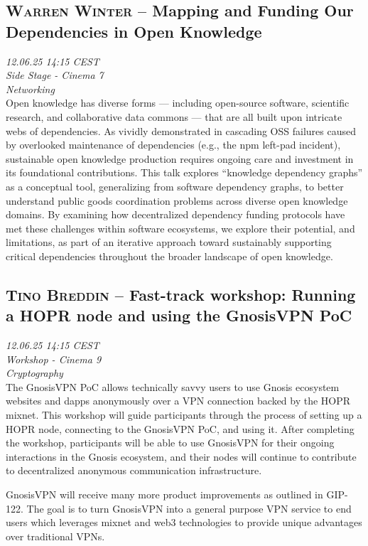 \subsection {\textsc{Warren Winter}  -- Mapping and Funding Our Dependencies in Open Knowledge} \noindent \textit {12.06.25 14:15 CEST\\ Side Stage - Cinema 7\\ Networking}\\[1em] Open knowledge has diverse forms — including open-source software, scientific research, and collaborative data commons — that are all built upon intricate webs of dependencies.  As vividly demonstrated in cascading OSS failures caused by overlooked maintenance of dependencies (e.g., the npm left-pad incident), sustainable open knowledge production requires ongoing care and investment in its foundational contributions.  This talk explores ``knowledge dependency graphs'' as a conceptual tool, generalizing from software dependency graphs, to better understand public goods coordination problems across diverse open knowledge domains.  By examining how decentralized dependency funding protocols have met these challenges within software ecosystems, we explore their potential, and limitations, as part of an iterative approach toward sustainably supporting critical dependencies throughout the broader landscape of open knowledge.

\clearpage
\subsection {\textsc{Tino Breddin}  -- Fast-track workshop: Running a HOPR node and using the GnosisVPN PoC} \noindent \textit {12.06.25 14:15 CEST\\ Workshop - Cinema 9\\ Cryptography}\\[1em] The GnosisVPN PoC allows technically savvy users to use Gnosis ecosystem websites and dapps anonymously over a VPN connection backed by the HOPR mixnet. This workshop will guide participants through the process of setting up a HOPR node, connecting to the GnosisVPN PoC, and using it. After completing the workshop, participants will be able to use GnosisVPN for their ongoing interactions in the Gnosis ecosystem, and their nodes will continue to contribute to decentralized anonymous communication infrastructure.

GnosisVPN will receive many more product improvements as outlined in GIP-122. The goal is to turn GnosisVPN into a general purpose VPN service to end users which leverages mixnet and web3 technologies to provide unique advantages over traditional VPNs.

